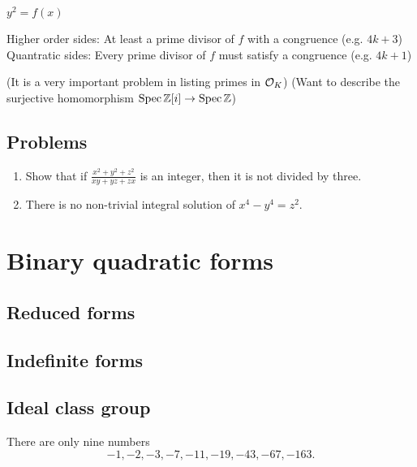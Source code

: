 \documentclass{../../large}
\begin{document}
\begin{prb}
$y^2=f(x)$

Higher order sides: At least a prime divisor of $f$ with a congruence (e.g. $4k+3$)
Quantratic sides: Every prime divisor of $f$ must satisfy a congruence (e.g. $4k+1$)
\end{prb}


\begin{prb}
(It is a very important problem in listing primes in $\mathcal{O}_K$)
(Want to describe the surjective homomorphism $\operatorname{Spec}\mathbb{Z}[i]\to\operatorname{Spec}\mathbb{Z}$)
\end{prb}



\section*{Problems}

\begin{enumerate}
\item Show that if $\frac{x^2+y^2+z^2}{xy+yz+zx}$ is an integer, then it is not divided by three.
\item There is no non-trivial integral solution of $x^4-y^4=z^2$.
\end{enumerate}

\chapter{}


\chapter{Binary quadratic forms}
\section{Reduced forms}
\section{Indefinite forms}

\section{Ideal class group}

\begin{prb}
There are only nine numbers
\[-1,-2,-3,-7,-11,-19,-43,-67,-163.\]
\end{prb}
\end{document}
